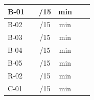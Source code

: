 \begin{center}
\begin{tabular}{|l|c|c|c|c|c|}
\hline
B-01 & \underline{\hspace{1.5cm}} & \underline{\hspace{1cm}}/15 & \underline{\hspace{1cm}}min & \underline{\hspace{1cm}} & \underline{\hspace{2cm}} \\
\hline
B-02 & \underline{\hspace{1.5cm}} & \underline{\hspace{1cm}}/15 & \underline{\hspace{1cm}}min & \underline{\hspace{1cm}} & \underline{\hspace{2cm}} \\
\hline
B-03 & \underline{\hspace{1.5cm}} & \underline{\hspace{1cm}}/15 & \underline{\hspace{1cm}}min & \underline{\hspace{1cm}} & \underline{\hspace{2cm}} \\
\hline
B-04 & \underline{\hspace{1.5cm}} & \underline{\hspace{1cm}}/15 & \underline{\hspace{1cm}}min & \underline{\hspace{1cm}} & \underline{\hspace{2cm}} \\
\hline
B-05 & \underline{\hspace{1.5cm}} & \underline{\hspace{1cm}}/15 & \underline{\hspace{1cm}}min & \underline{\hspace{1cm}} & \underline{\hspace{2cm}} \\
\hline
R-02 & \underline{\hspace{1.5cm}} & \underline{\hspace{1cm}}/15 & \underline{\hspace{1cm}}min & \underline{\hspace{1cm}} & \underline{\hspace{2cm}} \\
\hline
C-01 & \underline{\hspace{1.5cm}} & \underline{\hspace{1cm}}/15 & \underline{\hspace{1cm}}min & \underline{\hspace{1cm}} & \underline{\hspace{2cm}} \\

\end{tabular}
\end{center}
